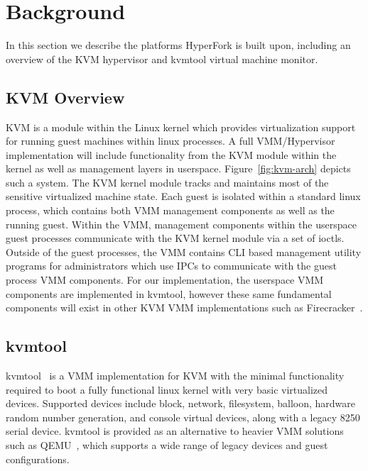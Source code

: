 \section{Background} \label{sec:background}

In this section we describe the platforms HyperFork is built upon, including an
overview of the KVM hypervisor and kvmtool virtual machine monitor.

\subsection{KVM Overview}

KVM is a module within the Linux kernel which provides virtualization support
for running guest machines within linux processes. A full VMM/Hypervisor
implementation will include functionality from the KVM module within the kernel
as well as management layers in userspace. Figure~\ref{fig:kvm-arch} depicts
such a system. The KVM kernel module tracks and maintains most of the sensitive
virtualized machine state. Each guest is isolated within a standard linux
process, which contains both VMM management components as well as the running
guest. Within the VMM, management components within the userspace guest
processes communicate with the KVM kernel module via a set of ioctls. Outside
of the guest processes, the VMM contains CLI based management utility programs
for administrators which use IPCs to communicate with the guest process VMM
components. For our implementation, the userspace VMM components are
implemented in kvmtool, however these same fundamental components will exist in
other KVM VMM implementations such as Firecracker~\cite{firecracker}.

\begin{figure*}[t]
  \texttt{[image: \{figures/kvm-arch]}}
  \caption{KVM Software Architecture}
  \label{fig:kvm-arch}
\end{figure*}

\subsection{kvmtool}

kvmtool~\cite{kvmtool} is a VMM implementation for KVM with the minimal
functionality required to boot a fully functional linux kernel with very basic
virtualized devices. Supported devices include block, network, filesystem,
balloon, hardware random number generation, and console virtual devices, along
with a legacy 8250 serial device. kvmtool is provided as an alternative to
heavier VMM solutions such as QEMU~\cite{qemu}, which supports a wide range of
legacy devices and guest configurations.

